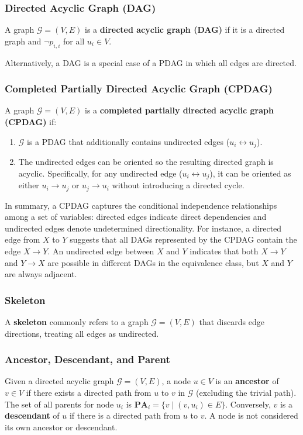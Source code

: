 \documentclass{article}
\begin{document}
	\subsubsection*{Directed Acyclic Graph (DAG)}
	A graph $\mathcal{G} = (V, E)$ is a \textbf{directed acyclic graph (DAG)} if it is a directed graph and $\neg p_{i, i}$ for all $u_i \in V$.
	
	Alternatively, a DAG is a special case of a PDAG in which all edges are directed.
	
	\subsubsection*{Completed Partially Directed Acyclic Graph (CPDAG)}
	A graph $\mathcal{G} = (V, E)$ is a \textbf{completed partially directed acyclic graph (CPDAG)} if:
	\begin{enumerate}
		\item $\mathcal{G}$ is a PDAG that additionally contains undirected edges ($u_i \leftrightarrow u_j$).
		\item The undirected edges can be oriented so the resulting directed graph is acyclic. Specifically, for any undirected edge ($u_i \leftrightarrow u_j$), it can be oriented as either $u_i \rightarrow u_j$ or $u_j \rightarrow u_i$ without introducing a directed cycle.
	\end{enumerate}
	
	In summary, a CPDAG captures the conditional independence relationships among a set of variables: directed edges indicate direct dependencies and undirected edges denote undetermined directionality. For instance, a directed edge from $X$ to $Y$ suggests that all DAGs represented by the CPDAG contain the edge $X \rightarrow Y$. An undirected edge between $X$ and $Y$ indicates that both $X \rightarrow Y$ and $Y \rightarrow X$ are possible in different DAGs in the equivalence class, but $X$ and $Y$ are always adjacent.
	
	\subsubsection*{Skeleton}
	A \textbf{skeleton} commonly refers to a graph $\mathcal{G} = (V, E)$ that discards edge directions, treating all edges as undirected.
	
	\subsubsection*{Ancestor, Descendant, and Parent}
	Given a directed acyclic graph $\mathcal{G} = (V, E)$, a node $u \in V$ is an \textbf{ancestor} of $v \in V$ if there exists a directed path from $u$ to $v$ in $\mathcal{G}$ (excluding the trivial path). The set of all parents for node $u_i$ is $\mathbf{PA}_i = \{v \mid (v, u_i) \in E\}$. Conversely, $v$ is a \textbf{descendant} of $u$ if there is a directed path from $u$ to $v$. A node is not considered its own ancestor or descendant.
	
\end{document}
